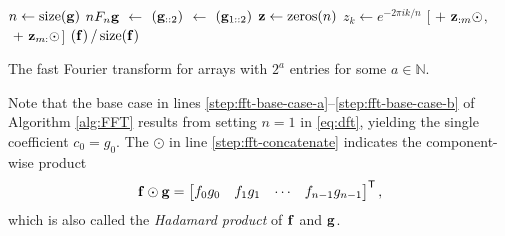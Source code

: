 \begin{algorithm}[H]
\begin{algorithmic}[1]
        \State $n \gets \mathrm{size}(\mathbf{g})$
            \label{step:fft-base-case-a}
            \State {} $n F_n \mathbf{g}$
                \label{step:fft-base-case-b}
        \Else{}
            \State {} $\gets$ $(\mathbf{g}_{::2})$
            \State {} $\gets$ $(\mathbf{g}_{1::2})$
            \State $\z \gets\zeros{n}$
                \label{step:fft-loop-a}
                \State $z_k \gets e^{-2\pi i k / n}$
                    \label{step:fft-loop-b}
            \EndFor
            \State {} $[$$\ +\ \mathbf{z}_{:m} \odot $$,\ $$\ +\ \mathbf{z}_{m:} \odot $$]$
                \label{step:fft-concatenate}
        \EndIf
    \EndProcedure
    \State {} $(\mathbf{f})\,/\,\mathrm{size}(\mathbf{f})$
\EndProcedure
\end{algorithmic}
\caption{The fast Fourier transform for arrays with $2^a$ entries for some $a \in \mathbb{N}$.}
\label{alg:FFT}
\end{algorithm}
Note that the base case in lines \ref{step:fft-base-case-a}--\ref{step:fft-base-case-b} of Algorithm \ref{alg:FFT} results from setting $n = 1$ in \eqref{eq:dft}, yielding the single coefficient $c_0 = g_0$.
The $\odot$ in line \ref{step:fft-concatenate} indicates the component-wise product
\begin{align*}
\mathbf{f}\odot\mathbf{g} = \begin{bmatrix}f_0g_0 & f_1g_1 & \cdots & f_{n-1}g_{n-1}\end{bmatrix}^{\mathsf T},
\end{align*}
which is also called the \emph{Hadamard product} of $\mathbf{f}$ and $\mathbf{g}$.


